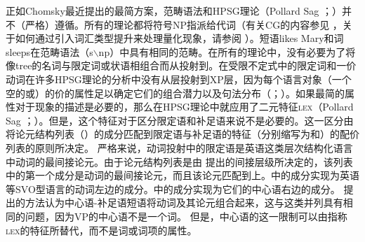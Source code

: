 正如Chomsky最近提出的最简方案，范畴语法\citep{Ajdukiewicz35a-u}和HPSG理论（Pollard \biband Sag \citeyear{ps}；\citeyear[--40]{ps2}）并不（严格）遵循\xbartc。所有的理论都将符号NP指派给代词（有关CG的内容参见 ，关于如何通过引入词汇类型提升来处理量化现象，请参阅 ）。短语likes Mary和词sleeps在范畴语法（s$\backslash$np）中具有相同的范畴。在所有的理论中，没有必要为了将像tree的名词与限定词或状语相组合而从\nnullc 投射到\nbarc。在受限不定式中的限定词和一价动词在许多HPSG理论的分析中没有从\xzeroc 层投射到XP层，因为每个语言对象（一个空的\subcatc 或\compslc）的价的属性足以确定它们的组合潜力以及句法分布（\citealp{Mueller96a}；\citealp{Mueller99a}）。如果最简的属性对于现象的描述是必要的，那么在HPSG理论中就应用了二元特征\textsc{lex}（Pollard \biband Sag \citeyear[]{ps}；\citeyear[]{ps2}）。但是，这个特征对于区分限定语和补足语来说不是必要的。这一区分由将论元结构列表（\argstc）的成分匹配到限定语与补足语的特征（分别缩写为\sprc 和\compsc）的配价列表的原则所决定。 严格来说，动词投射中的限定语是英语这类层次结构化语言中动词的最间接论元。由于论元结构列表是由 \citet{KC77a}提出的间接层级所决定的，该列表中的第一个成分是动词的最间接论元，而且该论元匹配到\sprlc 上。\sprlc 中的成分实现为英语等SVO型语言的动词左边的成分。\compslc 中的成分实现为它们的中心语右边的成分。 \citet[, 364]{GSag2000a-u}提出的方法认为中心语-补足语短语将动词及其论元组合起来，这与这类并列具有相同的问题，因为VP的中心语不是一个词。 
但是，中心语的这一限制可以由指称\textsc{lex}的特征所替代，而不是词或词项的属性。
